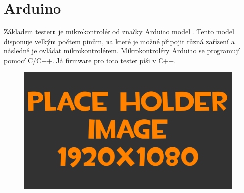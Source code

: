 
\section{Arduino}
Základem testeru je mikrokontrolér od značky Arduino model \ardMeg. Tento model disponuje velkým počtem pinům, na které je možné připojit různá zařízení a následně je ovládat mikrokontrolérem. Mikrokontroléry Arduino se programují pomocí C/C++. Já firmware pro toto tester píši v C++.

\begin{figure}[h!]
	\centering
	\includegraphics[width=\textwidth]{pictures/placeHolderFHD.png}
    	\caption{\ardMeg}
   	\label{fig:arduinoMega}
\end{figure}


%




